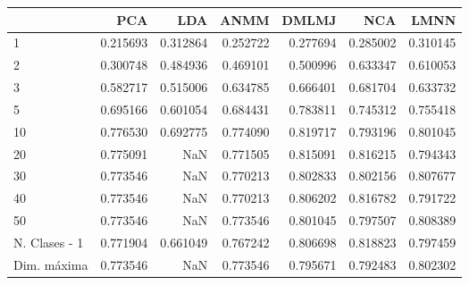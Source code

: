 \begin{tabular}{lrrrrrr}
\toprule
{} &       PCA &       LDA &      ANMM &     DMLMJ &       NCA &      LMNN \\
\midrule
1             &  0.215693 &  0.312864 &  0.252722 &  0.277694 &  0.285002 &  0.310145 \\
2             &  0.300748 &  0.484936 &  0.469101 &  0.500996 &  0.633347 &  0.610053 \\
3             &  0.582717 &  0.515006 &  0.634785 &  0.666401 &  0.681704 &  0.633732 \\
5             &  0.695166 &  0.601054 &  0.684431 &  0.783811 &  0.745312 &  0.755418 \\
10            &  0.776530 &  0.692775 &  0.774090 &  0.819717 &  0.793196 &  0.801045 \\
20            &  0.775091 &       NaN &  0.771505 &  0.815091 &  0.816215 &  0.794343 \\
30            &  0.773546 &       NaN &  0.770213 &  0.802833 &  0.802156 &  0.807677 \\
40            &  0.773546 &       NaN &  0.770213 &  0.806202 &  0.816782 &  0.791722 \\
50            &  0.773546 &       NaN &  0.773546 &  0.801045 &  0.797507 &  0.808389 \\
N. Clases - 1 &  0.771904 &  0.661049 &  0.767242 &  0.806698 &  0.818823 &  0.797459 \\
Dim. máxima   &  0.773546 &       NaN &  0.773546 &  0.795671 &  0.792483 &  0.802302 \\
\bottomrule
\end{tabular}
